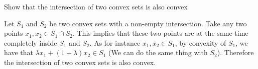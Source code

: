 \begin{problem}
Show that the intersection of two convex sets is also convex
\end{problem}

\begin{solution}
Let $S_1$ and $S_2$ be two convex sets with a non-empty intersection. Take any two points $x_1, x_2 \in S_1\cap S_2$. This implies that these two points are at the same time completely inside $S_1$ and $S_2$. As for instance $x_1,x_2 \in S_1$, by convexity of $S_1$, we have that $\lambda x_1 + (1-\lambda) x_2 \in S_1$ (We can do the same thing with $S_2$). Therefore the intersection of two convex sets is also convex.
\end{solution}

 	

